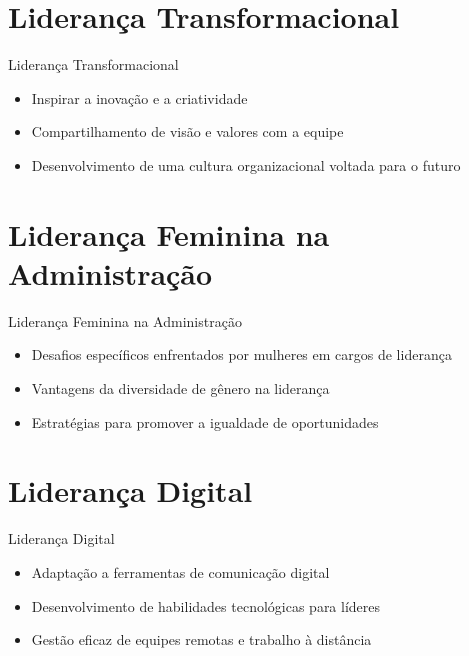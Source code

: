 \documentclass[aspectratio=169,xcolor=dvipsnames]{beamer}
\begin{document}
\section{Liderança Transformacional}

\begin{frame}{Liderança Transformacional}
	\begin{itemize}
		\item Inspirar a inovação e a criatividade
		\item Compartilhamento de visão e valores com a equipe
		\item Desenvolvimento de uma cultura organizacional voltada para o futuro

	\end{itemize}
\end{frame}

\section{Liderança Feminina na Administração}

\begin{frame}{Liderança Feminina na Administração}
	\begin{itemize}
		\item Desafios específicos enfrentados por mulheres em cargos de liderança
		\item Vantagens da diversidade de gênero na liderança
		\item Estratégias para promover a igualdade de oportunidades

	\end{itemize}
\end{frame}

\section{Liderança Digital}

\begin{frame}{Liderança Digital}
	\begin{itemize}
		\item Adaptação a ferramentas de comunicação digital
		\item Desenvolvimento de habilidades tecnológicas para líderes
		\item Gestão eficaz de equipes remotas e trabalho à distância

	\end{itemize}
\end{frame}


\end{document}

